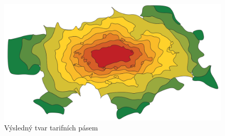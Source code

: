 \begin{figure}[H] \centering
    \includegraphics[width=400pt]{./pictures/vysledek.png}
    \caption[Výsledný tvar tarifních pásem]{Výsledný tvar tarifních pásem}
	\label{fig:vysledek}              
\end{figure}